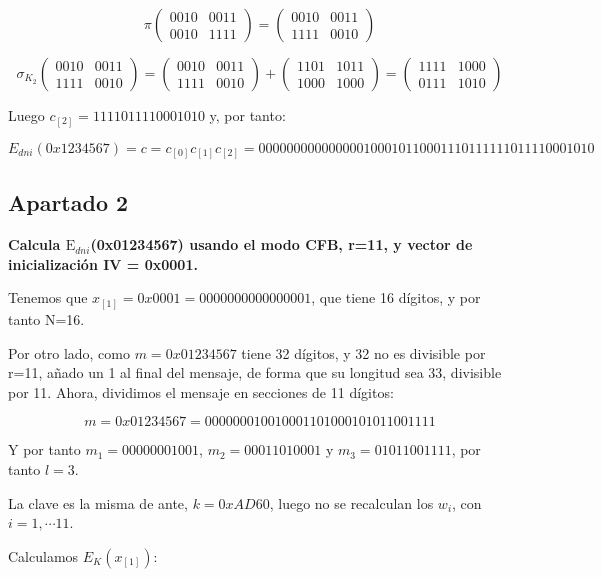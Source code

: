 \documentclass[a4paper]{article}
\begin{document}
$$\pi \begin{pmatrix} 0010 & 0011 \\ 0010 & 1111 \end{pmatrix} = \begin{pmatrix} 0010 & 0011 \\ 1111 & 0010 \end{pmatrix}$$

$$\sigma_{K_2} \begin{pmatrix} 0010 & 0011 \\ 1111 & 0010 \end{pmatrix} = \begin{pmatrix} 0010 & 0011 \\ 1111 & 0010 \end{pmatrix} + \begin{pmatrix} 1101 & 1011 \\ 1000 & 1000 \end{pmatrix} = \begin{pmatrix} 1111 & 1000 \\ 0111 & 1010 \end{pmatrix}$$

Luego $c_{[2]} = 1111 0111 1000 1010$ y, por tanto:

$$E_{dni}(0x1234567) = c = c_{[0]}c_{[1]}c_{[2]} = 0000 0000 0000 0001 0001 0110 0011 1011 1111 0111 1000 1010$$




\subsection{Apartado 2}
\textbf{Calcula $\text{E}_{dni}$(0x01234567) usando el modo CFB, r=11, y
vector de inicialización IV = 0x0001.}

Tenemos que $x_{[1]} = 0x0001=0000 0000 0000 0001$, que tiene 16 dígitos, y por tanto N=16.

Por otro lado, como $m=0x01234567$ tiene 32 dígitos, y 32 no es divisible por r=11, añado un 1 al final del mensaje, de forma que su longitud sea 33, divisible por 11. Ahora, dividimos el mensaje en secciones de 11 dígitos:

$$m = 0x01234567 = 0000 0001 0010 0011 0100 0101 0110 0111 1$$

Y por tanto $m_1=0000 0001 001$, $m_2=0 0011 0100 01$ y $m_3=01 0110 0111 1$, por tanto $l=3$.

La clave es la misma de ante, $k=0xAD60$, luego no se recalculan los $w_i$, con $i = 1, \cdots 11$.

Calculamos $E_K(x_{[1]})$:
\end{document}
